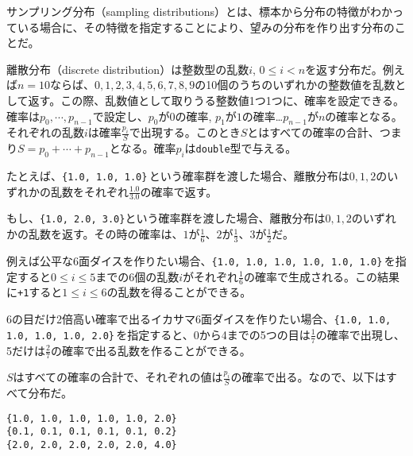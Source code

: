 
サンプリング分布（sampling distributions）とは、標本から分布の特徴がわかっている場合に、その特徴を指定することにより、望みの分布を作り出す分布のことだ。



離散分布（discrete distribution）は整数型の乱数\(i\), \(0 \leq i < n\)を返す分布だ。例えば\(n = 10\)ならば、\(0,1,2,3,4,5,6,7,8,9\)の10個のうちのいずれかの整数値を乱数として返す。この際、乱数値として取りうる整数値1つ1つに、確率を設定できる。確率は\(p_0, \cdots, p_{n-1}\)で設定し、\(p_0\)が\(0\)の確率, \(p_1\)が\(1\)の確率\ldots{}\(p_{n-1}\)が\(n\)の確率となる。それぞれの乱数\(i\)は確率\(\frac{p_i}{S}\)で出現する。このとき\(S\)とはすべての確率の合計、つまり\(S = p_0 + \cdots + p_{n-1}\)となる。確率\(p_i\)は\texttt{double}型で与える。

たとえば、\texttt{\{1.0, 1.0, 1.0\}}\,という確率群を渡した場合、離散分布は\(0, 1, 2\)のいずれかの乱数をそれぞれ\(\frac{1.0}{3.0}\)の確率で返す。

もし、\texttt{\{1.0, 2.0, 3.0\}}という確率群を渡した場合、離散分布は\(0, 1, 2\)のいずれかの乱数を返す。その時の確率は、\(1\)が\(\frac{1}{6}\)、\(2\)が\(\frac{1}{3}\)、\(3\)が\(\frac{1}{2}\)だ。

例えば公平な6面ダイスを作りたい場合、\texttt{\{1.0, 1.0, 1.0, 1.0, 1.0, 1.0\}}\,を指定すると\(0 \leq i \leq 5\)までの6個の乱数\(i\)がそれぞれ\(\frac{1}{6}\)の確率で生成される。この結果に\texttt{+1}すると\(1 \leq i \leq 6\)の乱数を得ることができる。

6の目だけ2倍高い確率で出るイカサマ6面ダイスを作りたい場合、\texttt{\{1.0, 1.0, 1.0, 1.0, 1.0, 2.0\}}\,を指定すると、0から4までの5つの目は\(\frac{1}{7}\)の確率で出現し、5だけは\(\frac{2}{7}\)の確率で出る乱数を作ることができる。

\(S\)はすべての確率の合計で、それぞれの値は\(\frac{p_i}{S}\)の確率で出る。なので、以下はすべて分布だ。

\begin{lstlisting}[style=terminal]
{1.0, 1.0, 1.0, 1.0, 1.0, 2.0}
{0.1, 0.1, 0.1, 0.1, 0.1, 0.2}
{2.0, 2.0, 2.0, 2.0, 2.0, 4.0}
\end{lstlisting}

